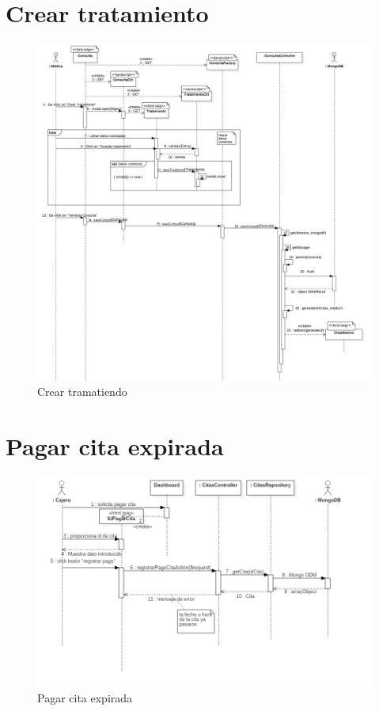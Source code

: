 \newpage

\section{ Crear tratamiento}
\begin{figure}[htbp!]
	\centering
	\includegraphics[width=1\textwidth]{uml/DiagramasSecuencia/AdrianGalindo/crearTratamiento}
	\caption{Crear tramatiendo}
\end{figure}

\newpage



\section{Pagar cita expirada}

\begin{figure}[htbp!]
	\centering
	\includegraphics[width=1\textwidth]{uml/DiagramasSecuencia/DavidPacheco/pagar-cita-cita-expirada}
	\caption{Pagar cita expirada}
\end{figure}
\newpage

